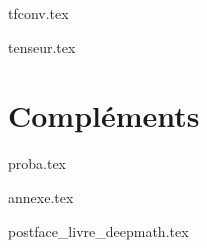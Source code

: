 \documentclass[11pt]{report}
\begin{document}
{tfconv.tex}

{tenseur.tex}



\part{Compléments}

{proba.tex}

{annexe.tex}

{postface_livre_deepmath.tex}


\vfill
\bigskip
\bigskip

\end{document}
